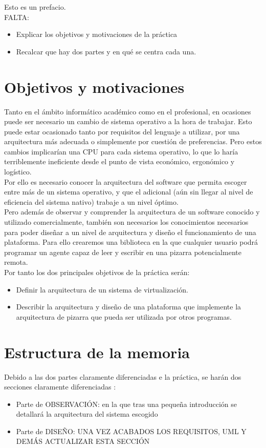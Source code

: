 \lettrine[lines=1,slope=4pt,findent=0pt]{E}{}sto es un prefacio.\\

\color{red}
FALTA:
\begin{itemize}
\item Explicar los objetivos y motivaciones de la práctica
\item Recalcar que hay dos partes y en qué se centra cada una.
\end{itemize}
\color{black}
\section{Objetivos y motivaciones}
Tanto en el ámbito informático académico como en el profesional, en ocasiones puede ser necesario un cambio de sistema operativo a la hora de trabajar. Esto puede estar ocasionado tanto por requisitos del lenguaje a utilizar, por una arquitectura más adecuada o simplemente por cuestión de preferencias. Pero estos cambios implicarían una CPU para cada sistema operativo, lo que lo haría terriblemente ineficiente desde el punto de vista económico, ergonómico y logístico. \\
Por ello es necesario conocer la arquitectura del software que permita escoger entre más de un sistema operativo, y que el adicional (aún sin llegar al nivel de eficiencia del sistema nativo) trabaje a un nivel óptimo.\\
Pero además de observar y comprender la arquitectura de un software conocido y utilizado comercialmente, también son necesarios los conocimientos necesarios para poder diseñar a un nivel de arquitectura y diseño el funcionamiento de una plataforma. Para ello crearemos una biblioteca en la que cualquier usuario podrá programar un agente capaz de leer y escribir en una pizarra potencialmente remota.\\
Por tanto los dos principales objetivos de la práctica serán:
\begin{itemize}
\item Definir la arquitectura de un sistema de virtualización.
\item Describir la arquitectura y diseño de una plataforma que implemente la arquitectura de pizarra que pueda ser utilizada por otros programas.
\end{itemize}

\section{Estructura de la memoria}
Debido a las dos partes claramente diferenciadas e la práctica, se harán dos secciones claramente diferenciadas :
\begin{itemize}
\item Parte de OBSERVACIÓN: en la que tras una pequeña introducción se detallará la arquitectura del sistema escogido
\item Parte de DISEÑO: \color{red} UNA VEZ ACABADOS LOS REQUISITOS, UML Y DEMÁS ACTUALIZAR ESTA SECCIÓN
\end{itemize}

